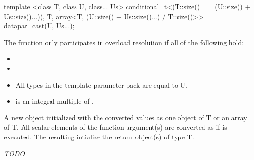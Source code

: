 \begin{itemdecl}
template <class T, class U, class... Us>
conditional_t<(T::size() == (U::size() + Us::size()...)), T,
            array<T, (U::size() + Us::size()...) / T::size()>> datapar_cast(U, Us...);
\end{itemdecl}
\begin{itemdescr}
  \pnum\remarks The  function only participates in overload resolution if all of the following hold:
  \begin{itemize}
    \item {}
    \item {}
    \item All types in the template parameter pack  are equal to \type U.
    \item {} is an integral multiple of .
  \end{itemize}

  \pnum\returns A new \datapar object initialized with the converted values as one object of \type T or an array of \type T.
  All scalar elements  of the function argument(s) are converted as if
   is executed.
  The resulting  intialize the return object(s) of type \type T.
\end{itemdescr}

\textit{TODO}

